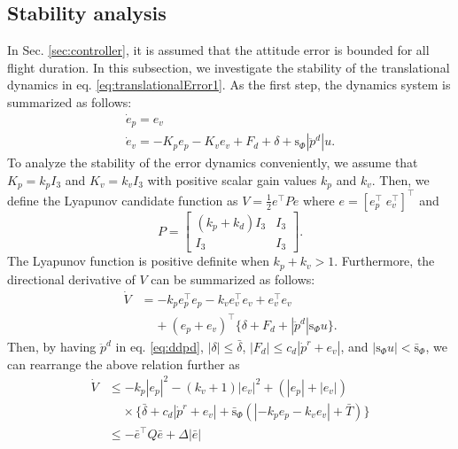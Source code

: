 \documentclass[letterpaper, 10 pt, conference]{ieeeconf}  %
\begin{document}
\subsection{Stability analysis}
In Sec. \ref{sec:controller}, it is assumed that the attitude error is bounded for all flight duration.
In this subsection, we investigate the stability of the translational dynamics in eq. \eqref{eq:translationalError1}.  
As the first step, the dynamics system is summarized as follows: 
\begin{equation}
\begin{array}{l}
\dot{e}_p = e_v \\
\dot{e}_v = -K_pe_p-K_ve_v+F_d+\delta+\text{s}_\Phi|\ddot{p}^d| u. 
\end{array} \label{eq:errorDynamics}
\end{equation}
To analyze the stability of the error dynamics conveniently, we assume that $K_p = k_pI_3$ and $K_v = k_vI_3$ with positive scalar gain values $k_p$ and $k_v$. 
Then, we define the Lyapunov candidate function as $V=\frac{1}{2}e^\top P e$ where $e = [e_p^\top\;e_v^\top]^\top$ and
\begin{equation}
P = \left[
\begin{array}{rr}
(k_p+k_d)I_3 & I_3 \\ I_3 & I_3
\end{array}
\right]. \nonumber
\end{equation}
The Lyapunov function is positive definite when $k_p + k_v > 1$.
Furthermore, the directional derivative of $V$ can be summarized as follows:
\begin{align}
\dot{V} &= -k_p e_p^\top e_p -k_v e_v^\top e_v + e_v^\top e_v \nonumber \\
&\;\;\;\;+(e_p+e_v)^\top\{\delta + F_d + |\ddot{p}^d|\text{s}_\Phi u\}.
\end{align}
Then, by having $\ddot{p}^d$ in eq. \eqref{eq:ddpd}, $|\delta|\leq\bar{\delta}$, $|F_d| \leq c_d|\dot{p}^r+e_v|$, and $|\text{s}_\Phi u| < \bar{\text{s}}_\Phi$, we can rearrange the above relation further as
\begin{align}
\dot{V} &\leq -k_p|e_p|^2 -(k_v+1)|e_v|^2 +(|e_p| + |e_v|)\nonumber \\
&\;\;\;\;\times\{\bar{\delta} + c_d|\dot{p}^r+e_v|+\bar{\text{s}}_\Phi(|-k_pe_p-k_ve_v|+\bar{T})\} \nonumber \\
&\leq -\bar{e}^\top Q\bar{e} + \Delta|\bar{e}| \label{eq:dotV}
\end{align} 
\end{document}
